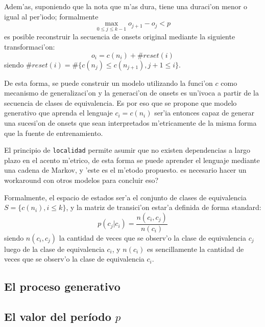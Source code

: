 Adem'as, suponiendo que la nota que m'as dura, tiene una duraci'on menor o igual al per'iodo; formalmente $$\max_{0\leq j \leq k-1}o_{j+1}-o_j < p$$ es posible reconstruir 
la secuencia de onsets original mediante la siguiente transformaci'on:
$$o_i=c(n_i) + \#reset(i)$$ siendo $\#reset(i)=\#\{c(n_j) \leq c(n_{j+1}), j+1 \leq i\}$.

De esta forma, se puede construir un modelo utilizando la funci'on $c$ como mecanismo de generalizaci'on y la generaci'on de onsets es un'ivoca a partir de la secuencia de 
clases de equivalencia. Es por eso que se propone que modelo generativo que aprenda el lenguaje $c_i=c(n_i)$ ser'ia entonces capaz de generar una sucesi'on de onsets 
que sean interpretados m'etricamente de la misma forma que la fuente de entrenamiento. 


El principio de \texttt{localidad} permite asumir que no existen dependencias a largo plazo en el acento m'etrico, de esta forma se puede aprender el lenguaje mediante
una cadena de Markov, y 'este es el m'etodo propuesto. \alert{es necesario hacer un workaround con otros modelos para concluir eso?}

Formalmente, el espacio de estados ser'a el conjunto de clases de equivalencia $S=\{c(n_i), i\leq k \}$, y la matriz de transici'on estar'a definida de forma standard:
$$p(c_j|c_i) = \frac{n(c_i, c_j)}{n(c_i)}$$
siendo $n(c_i, c_j)$ la cantidad de veces que se observ'o la clase de equivalencia $c_j$ luego de la clase de equivalencia $c_i$, y $n(c_i)$ es sencillamente la cantidad de 
veces que se observ'o la clase de equivalencia $c_i$.


\subsection{El proceso generativo}


\subsection{El valor del per\'iodo $p$}

